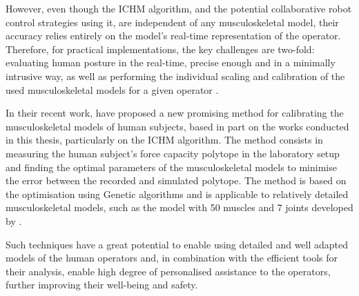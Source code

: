 However, even though the ICHM algorithm, and the potential collaborative robot control strategies using it, are independent of any musculoskeletal model, their accuracy relies entirely on the model's real-time representation of the operator. Therefore, for practical implementations, the key challenges are two-fold: evaluating human posture in the real-time, precise enough and in a minimally intrusive way, as well as performing the individual scaling and calibration of the used musculoskeletal models for a given operator \cite{correa20112782}.

In their recent work, \citet{laisne2023Genetic} have proposed a new promising method for calibrating the musculoskeletal models of human subjects, based in part on the works conducted in this thesis, particularly on the ICHM algorithm. The method consists in measuring the human subject's force capacity polytope in the laboratory setup and finding the optimal parameters of the musculoskeletal models to minimise the error between the recorded and simulated polytope. The method is based on the optimisation using Genetic algorithms and is applicable to relatively detailed musculoskeletal models, such as the model with 50 muscles and 7 joints developed by \citet{holzbaur2005model}.

Such techniques have a great potential to enable using detailed and well adapted models of the human operators and, in combination with the efficient tools for their analysis, enable high degree of personalised assistance to the operators, further improving their well-being and safety.


